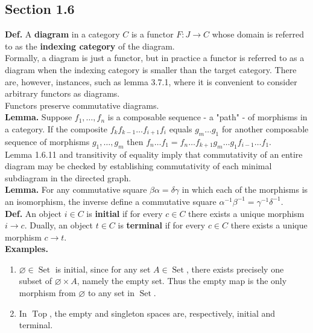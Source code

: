 \documentclass[a4paper]{article}
\theoremstyle{plain}%
\theoremstyle{definition}
\theoremstyle{remark}
\DeclareMathOperator{\Set}{Set}
\DeclareMathOperator{\Top}{Top}
\begin{document}
 \subsection*{Section 1.6}

\textbf{Def.} A \textbf{diagram} in a category $C$ is a functor $F  \colon
J \to C$ whose domain is referred to as the \textbf{indexing category} of the
diagram.\\
\linebreak
Formally, a diagram is just a functor, but in practice a functor is referred to
as a diagram when the indexing category is smaller than the target category.
There are, however, instances, such as lemma 3.7.1, where it is convenient to
consider arbitrary functors as diagrams.\\
\linebreak
Functors preserve commutative diagrams.\\
\linebreak
\textbf{Lemma.} Suppose $f_1, \ldots, f_n$ is a composable sequence - a "path"
- of morphisms in a category. If the composite $f_k f_{k-1} \ldots f_{i+1} f_i$
equals $g_m \ldots g_1$ for another composable sequence of morphisms $g_1,
\ldots, g_m$ then $f_n \ldots f_1 = f_{n} \ldots f_{k+1} g_m \ldots g_1 f_{i-1}
\ldots f_1$.\\
\linebreak
Lemma 1.6.11 and transitivity of equality imply that commutativity of an entire
diagram may be checked by establishing commutativity of each minimal subdiagram
in the directed graph.\\
\linebreak
\textbf{Lemma.} For any commutative square $\beta \alpha = \delta \gamma$ in
which each of the morphisms is an isomorphism, the inverse define a commutative
square $\alpha^{-1} \beta^{-1} = \gamma^{-1} \delta^{-1}$.\\
\linebreak
\textbf{Def.} An object $i \in C$ is \textbf{initial} if for every $c \in C$
there
exists a unique morphism $i \to c$. Dually, an object $t \in C$ is
\textbf{terminal} if for every $c \in C$ there exists a unique morphism
$c \to t$.\\
\linebreak
\textbf{Examples.}\\
\begin{enumerate}
    \item $\varnothing \in \Set$ is initial, since for any set $A \in \Set$,
        there exists precisely one subset of $\varnothing \times A$, namely the
        empty set. Thus the empty map is the only morphism from  $\varnothing$ 
        to any set in $\Set$.
    \item In $\Top$, the empty and singleton spaces are, respectively, initial
        and terminal.
\end{enumerate}
\end{document}
